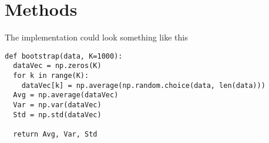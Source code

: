 \section{Methods} \label{sec:methods}

The implementation could look something like this
\lstset{basicstyle=\scriptsize}
\begin{lstlisting}
def bootstrap(data, K=1000):
  dataVec = np.zeros(K)
  for k in range(K):
    dataVec[k] = np.average(np.random.choice(data, len(data)))
  Avg = np.average(dataVec)
  Var = np.var(dataVec)
  Std = np.std(dataVec)
    
  return Avg, Var, Std
\end{lstlisting}
